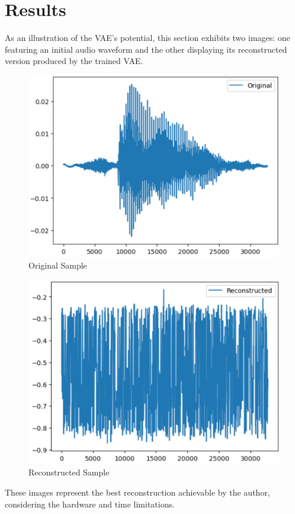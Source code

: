 \section{Results}

As an illustration of the \ac{VAE}'s potential, this section exhibits two images: one featuring an initial audio waveform and the other displaying its reconstructed version produced by the trained \ac{VAE}.

\begin{figure}[ht]
    \centering
    \includegraphics[width=0.7\linewidth]{figures/annexes/VAE/original.png}
    \caption{Original Sample}
\end{figure}

\begin{figure}[ht]
    \centering
    \includegraphics[width=0.7\linewidth]{figures/annexes/VAE/reconstructed.png}
    \caption{Reconstructed Sample}
\end{figure}

These images represent the best reconstruction achievable by the author, considering the hardware and time limitations.

\clearpage
